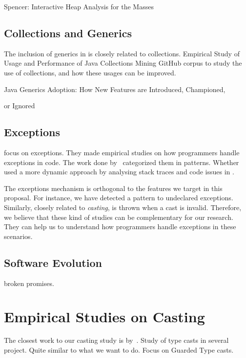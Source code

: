 Spencer: Interactive Heap Analysis for the Masses
\cite{brandauer_spencer:_2017}


\subsection*{Collections and Generics}

The inclusion of generics in \java{} is closely related to collections.
Empirical Study of Usage and Performance of Java Collections
Mining GitHub corpus to study the use of collections, and how these usages can be improved.
\cite{costa_empirical_2017}

Java Generics Adoption: How New Features are Introduced, Championed,

or Ignored~\cite{parnin_java_2011,parnin_adoption_2013}


\subsection*{Exceptions}

\cite{kery_examining_2016,asaduzzaman_how_2016} focus on exceptions.
They made empirical studies on how programmers handle exceptions in \java{} code.
The work done by~\cite{nakshatri_analysis_2016} categorized them in patterns.
Whether~\cite{coelho_unveiling_2015} used a more dynamic approach by analysing stack traces and code issues in \github{}.

The exceptions mechanism is orthogonal to the features we target in this proposal.
For instance, we have detected a \smu{} pattern to \throw{} undeclared exceptions.
Similarly, closely related to \emph{casting}, \cce{} is thrown when a cast is invalid.
Therefore, we believe that these kind of studies can be complementary for our research. They can help us to understand how programmers handle exceptions in these scenarios.

\subsection*{Software Evolution}

\cite{dietrich_broken_2014} broken promises.


\section{Empirical Studies on Casting}

The closest work to our casting study is by~\cite{winther_guarded_2011}.
Study of type casts in several project.
Quite similar to what we want to do.
Focus on Guarded Type casts.


